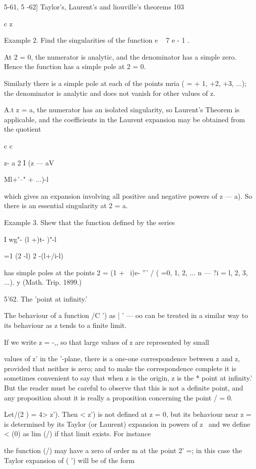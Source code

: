{{{{5-61, 5 -62] Taylor's, Laurent's and liouville's theorems 103

c z\

Example 2. Find the singularities of the function e ~ 7 e - 1 .

At 2 = 0, the numerator is analytic, and the denominator has a simple
zero. Hence the function has a simple pole at 2 = 0.

Similarly there is a simple pole at each of the points mria ( = + 1,
+2, +3, ...); the denominator is analytic and does not vanish for
other values of z.

A.t z = a, the numerator has an isolated singularity, so Laurent's
Theorem is applicable, and the coefficients in the Laurent expansion
may be obtained from the quotient

c c

z- a 2 I (z — aV

Ml+'--" + ...)-l

which gives an expansion involving all positive and negative powers of
z — a). So there is an essential singularity at 2 = a.

Example 3. Shew that the function defined by the series

I wg"- (l +)t- )"-l

 =1 (2 -l) 2 -(l+/i-l)

has simple poles at the points 2 = (1 + ~i)e- ''' / ( =0, 1, 2, ... n
— \; ?i = l, 2, 3, ...). y (Math. Trip. 1899.)

5'62. The 'point at infinity.'

The behaviour of a function /C ') as | ' — oo can be treated in a
similar way to its behaviour as z tends to a finite limit.

If we write z = -,, so that large values of z are represented by small

values of z' in the '-plane, there is a one-one correspondence between
z and z, provided that neither is zero; and to make the
correspondence complete it is sometimes convenient to say that when z
is the origin, z is the * point at infinity.' But the reader must be
careful to observe that this is not a definite point, and any
proposition about it is really a proposition concerning the point / =
0.

Let/(2 ) = 4> z'). Then < z') is not defined at z = 0, but its
behaviour near z = is determined by its Taylor (or Laurent) expansion
in powers of z \ and we define < (0) as lim (/) if that limit exists.
For instance

the function (/) may have a zero of order m at the point 2' =; in
this case the Taylor expansion of ( ') will be of the form

}}}}
